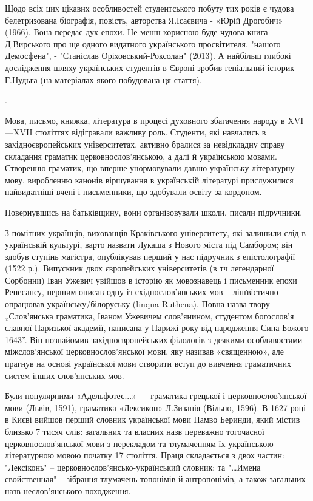 Щодо всіх цих цікавих особливостей студентського побуту тих років є чудова
белетризована біографія, повість, авторства Я.Ісаєвича - «Юрій Дрогобич»
(1966). Вона передає дух епохи. Не менш корисною буде чудова книга Д.Вирського
про ще одного видатного українського просвітителя, "нашого Демосфена", -
"Станіслав Оріховський-Роксолан" (2013). А найбільш глибокі дослідження шляху
українських студентів в Європі зробив геніальний історик Г.Нудьга (на
матеріалах якого побудована ця стаття).

.

Мова, письмо, книжка, література в процесі духовного збагачення народу в
XVI—XVII століттях відігравали важливу роль. Студенти, які навчались в
західноєвропейських університетах, активно бралися за невідкладну справу
складання граматик церковнослов'янською, а далі й українською мовами. Створенню
граматик, що вперше унормовували давню українську літературну мову, виробленню
канонів віршування в українській літературі прислужилися найвидатніші вчені і
письменники, що здобували освіту за кордоном. 

Повернувшись на батьківщину, вони організовували школи, писали підручники. 

З помітних українців, вихованців Краківського університету, які залишили слід в
українській культурі, варто назвати Лукаша з Нового міста під Самбором; він
здобув ступінь магістра, опублікував перший у нас підручник з епістолографії
(1522 р.). Випускник двох європейських університетів (в тч легендарної
Сорбонни) Іван Ужевич увійшов в історію як мовознавець і письменник епохи
Ренесансу, першим описав одну із східнослов’янських мов – лінґвістично
опрацював українську/білоруську (linqua Ruthena). Повна назва твору
„Слов’янська граматика, Іваном Ужевичем слов’янином, студентом богослов’я
славної Паризької академії, написана у Парижі року від народження Сина Божого
1643”. Він познайомив західноєвропейських філологів з деякими особливостями
міжслов’янської церковнослов’янської мови, яку називав «священною», але прагнув
на основі української мови створити вступ до вивчення граматичних систем інших
слов’янських мов.

Були популярними «Адельфотес...» — граматика грецької і церковнослов'янської
мови (Львів, 1591), граматика «Лексикон» Л.Зизанія (Вільно, 1596). В 1627 році
в Києві вийшов перший словник української мови Памво Беринди, який містив
близько 7 тисяч слів: загальних та власних назв переважно тогочасної
церковнослов'янської мови з перекладом та тлумаченням їх українською
літературною мовою початку 17 століття. Праця складається з двох частин:
"Лексіконь" – церковнослов'янсько-український словник; та "…Имена свойственная"
– зібрання тлумачень топонімів й антропонімів, а також загальних назв
неслов'янського походження.

